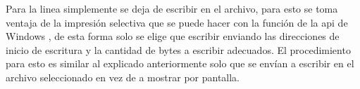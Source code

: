 Para  la linea simplemente se deja de escribir en el archivo,
para esto se toma ventaja de la impresión selectiva que se puede hacer con la
función de la api de Windows , de esta forma solo se elige
que escribir enviando las direcciones de inicio de escritura y la cantidad de
bytes a escribir adecuados. El procedimiento para esto es similar al explicado
anteriormente solo que se envían a escribir en el archivo seleccionado  en vez
de a mostrar por pantalla.















